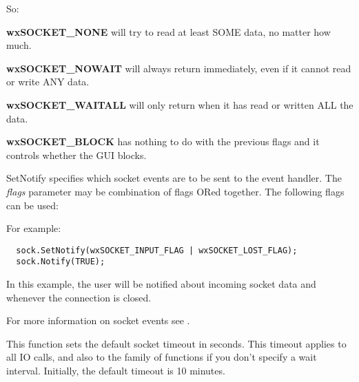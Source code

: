So:

{\bf wxSOCKET\_NONE} will try to read at least SOME data, no matter how much.

{\bf wxSOCKET\_NOWAIT} will always return immediately, even if it cannot
read or write ANY data.

{\bf wxSOCKET\_WAITALL} will only return when it has read or written ALL
the data.

{\bf wxSOCKET\_BLOCK} has nothing to do with the previous flags and
it controls whether the GUI blocks.

%
%
\label{wxsocketbasesetnotify}


SetNotify specifies which socket events are to be sent to the event handler.
The {\it flags} parameter may be combination of flags ORed together. The
following flags can be used:

\twocolwidtha{7cm}
\begin{twocollist}\itemsep=0pt
\end{twocollist}

For example:

\begin{verbatim}
  sock.SetNotify(wxSOCKET_INPUT_FLAG | wxSOCKET_LOST_FLAG);
  sock.Notify(TRUE);
\end{verbatim}

In this example, the user will be notified about incoming socket data and
whenever the connection is closed.

For more information on socket events see .

%
%
\label{wxsocketbasesettimeout}


This function sets the default socket timeout in seconds. This timeout
applies to all IO calls, and also to the  family
of functions if you don't specify a wait interval. Initially, the default
timeout is 10 minutes.

%
%
\label{wxsocketbasepeek}

